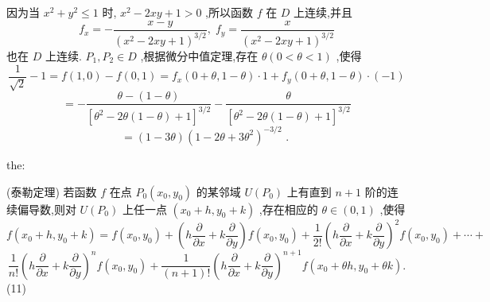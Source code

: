 因为当 \({x}^{2} + {y}^{2} \leq  1\) 时, \({x}^{2} - {2xy} + 1 > 0\) ,所以函数 \(f\) 在 \(D\) 上连续,并且
\[
{f}_{x} =  - \frac{x - y}{{\left( {x}^{2} - 2xy + 1\right) }^{3/2}},\;{f}_{y} = \frac{x}{{\left( {x}^{2} - 2xy + 1\right) }^{3/2}}
\]
也在 \(D\) 上连续. \({P}_{1},{P}_{2} \in  D\) ,根据微分中值定理,存在 \(\theta \left( {0 < \theta  < 1}\right)\) ,使得
\[
\frac{1}{\sqrt{2}} - 1 = f\left( {1,0}\right)  - f\left( {0,1}\right)  = {f}_{x}\left( {0 + \theta ,1 - \theta }\right)  \cdot  1 + {f}_{y}\left( {0 + \theta ,1 - \theta }\right)  \cdot  \left( {-1}\right)
\]
\[
=  - \frac{\theta  - \left( {1 - \theta }\right) }{{\left\lbrack  {\theta }^{2} - 2\theta \left( 1 - \theta \right)  + 1\right\rbrack  }^{3/2}} - \frac{\theta }{{\left\lbrack  {\theta }^{2} - 2\theta \left( 1 - \theta \right)  + 1\right\rbrack  }^{3/2}}
\]
\[
= \left( {1 - {3\theta }}\right) {\left( 1 - 2\theta  + 3{\theta }^{2}\right) }^{-3/2}\text{ . }
\]
\begin{theorem}{}{the:}

\end{theorem}
 (泰勒定理) 若函数 \(f\) 在点 \({P}_{0}\left( {{x}_{0},{y}_{0}}\right)\) 的某邻域 \(U\left( {P}_{0}\right)\) 上有直到 \(n + 1\) 阶的连续偏导数,则对 \(U\left( {P}_{0}\right)\) 上任一点 \(\left( {{x}_{0} + h,{y}_{0} + k}\right)\) ,存在相应的 \(\theta  \in  \left( {0,1}\right)\) ,使得
\[
f\left( {{x}_{0} + h,{y}_{0} + k}\right)  = f\left( {{x}_{0},{y}_{0}}\right)  + \left( {h\frac{\partial }{\partial x} + k\frac{\partial }{\partial y}}\right) f\left( {{x}_{0},{y}_{0}}\right)  + \frac{1}{2!}{\left( h\frac{\partial }{\partial x} + k\frac{\partial }{\partial y}\right) }^{2}f\left( {{x}_{0},{y}_{0}}\right)  + \cdots  +
\]
\[
\frac{1}{n!}{\left( h\frac{\partial }{\partial x} + k\frac{\partial }{\partial y}\right) }^{n}f\left( {{x}_{0},{y}_{0}}\right)  + \frac{1}{\left( {n + 1}\right) !}{\left( h\frac{\partial }{\partial x} + k\frac{\partial }{\partial y}\right) }^{n + 1}f\left( {{x}_{0} + {\theta h},{y}_{0} + {\theta k}}\right) .
\]
(11)

